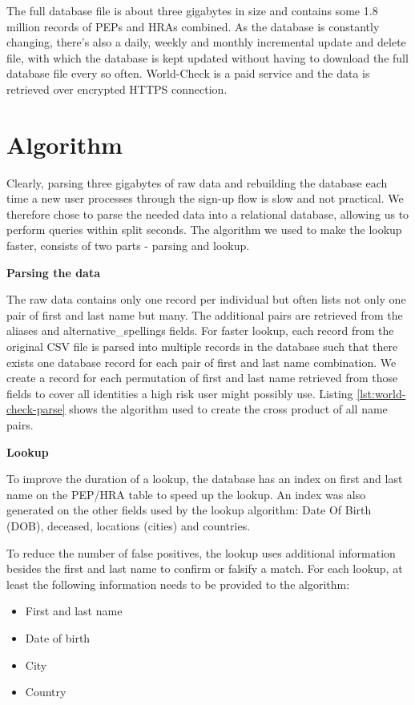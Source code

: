\documentclass[a4paper, oneside]{csthesis}
\begin{document}
The full database file is about three gigabytes in size and contains some 1.8 million records of PEPs and HRAs combined. As the database is constantly changing, there's also a daily, weekly and monthly incremental update and delete file, with which the database is kept updated without having to download the full database file every so often.
World-Check is a paid service and the data is retrieved over encrypted HTTPS connection.




\section{Algorithm}

Clearly, parsing three gigabytes of raw data and rebuilding the database each time a new user processes through the sign-up flow is slow and not practical. We therefore chose to parse the needed data into a relational database, allowing us to perform queries within split seconds. The algorithm we used to make the lookup faster, consists of two parts - parsing and lookup.

\textbf{Parsing the data}

The raw data contains only one record per individual but often lists not only one pair of first and last name but many. The additional pairs are retrieved from the aliases and alternative\_spellings fields. For faster lookup, each record from the original CSV file is parsed into multiple records in the database such that there exists one database record for each pair of first and last name combination. We create a record for each permutation of first and last name retrieved from those fields to cover all identities a high risk user might possibly use.
Listing \ref{lst:world-check-parse} shows the algorithm used to create the cross product of all name pairs.

\textbf{Lookup}

To improve the duration of a lookup, the database has an index on first and last name on the PEP/HRA table to speed up the lookup. An index was also generated on the other fields used by the lookup algorithm: Date Of Birth (DOB), deceased, locations (cities) and countries.

To reduce the number of false positives, the lookup uses additional information besides the first and last name to confirm or falsify a match. For each lookup, at least the following information needs to be provided to the algorithm:
\begin{itemize}
\item First and last name
\item Date of birth
\item City
\item Country
\end{itemize}
\end{document}
